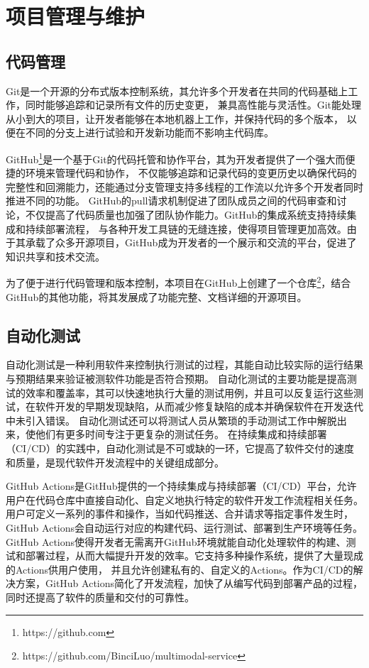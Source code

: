 \documentclass[a4paper,AutoFakeBold,oneside,12pt]{book}
\begin{document}
\chapter{项目管理与维护} %
\section{代码管理}
Git是一个开源的分布式版本控制系统，其允许多个开发者在共同的代码基础上工作，同时能够追踪和记录所有文件的历史变更，
兼具高性能与灵活性。Git能处理从小到大的项目，让开发者能够在本地机器上工作，并保持代码的多个版本，
以便在不同的分支上进行试验和开发新功能而不影响主代码库。

GitHub\footnote{https://github.com}是一个基于Git的代码托管和协作平台，其为开发者提供了一个强大而便捷的环境来管理代码和协作，
不仅能够追踪和记录代码的变更历史以确保代码的完整性和回溯能力，还能通过分支管理支持多线程的工作流以允许多个开发者同时推进不同的功能。
GitHub的pull请求机制促进了团队成员之间的代码审查和讨论，不仅提高了代码质量也加强了团队协作能力。GitHub的集成系统支持持续集成和持续部署流程，
与各种开发工具链的无缝连接，使得项目管理更加高效。由于其承载了众多开源项目，GitHub成为开发者的一个展示和交流的平台，促进了知识共享和技术交流。

为了便于进行代码管理和版本控制，本项目在GitHub上创建了一个仓库\footnote{https://github.com/BinciLuo/multimodal-service}，结合GitHub的其他功能，将其发展成了功能完整、文档详细的开源项目。


\section{自动化测试}
自动化测试是一种利用软件来控制执行测试的过程，其能自动比较实际的运行结果与预期结果来验证被测软件功能是否符合预期。
自动化测试的主要功能是提高测试的效率和覆盖率，其可以快速地执行大量的测试用例，并且可以反复运行这些测试，在软件开发的早期发现缺陷，从而减少修复缺陷的成本并确保软件在开发迭代中未引入错误。
自动化测试还可以将测试人员从繁琐的手动测试工作中解脱出来，使他们有更多时间专注于更复杂的测试任务。
在持续集成和持续部署（CI/CD）的实践中，自动化测试是不可或缺的一环，它提高了软件交付的速度和质量，是现代软件开发流程中的关键组成部分。

GitHub Actions是GitHub提供的一个持续集成与持续部署（CI/CD）平台，允许用户在代码仓库中直接自动化、自定义地执行特定的软件开发工作流程相关任务。
用户可定义一系列的事件和操作，当如代码推送、合并请求等指定事件发生时，GitHub Actions会自动运行对应的构建代码、运行测试、部署到生产环境等任务。
GitHub Actions使得开发者无需离开GitHub环境就能自动化处理软件的构建、测试和部署过程，从而大幅提升开发的效率。它支持多种操作系统，提供了大量现成的Actions供用户使用，
并且允许创建私有的、自定义的Actions。作为CI/CD的解决方案，GitHub Actions简化了开发流程，加快了从编写代码到部署产品的过程，同时还提高了软件的质量和交付的可靠性。
\end{document}
